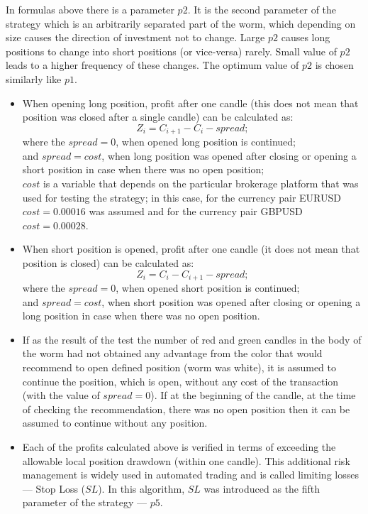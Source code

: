 \documentclass[runningheads,a4paper]{llncs}
\begin{document}
In formulas above there is a parameter $p2$. It is the second parameter of the strategy which is an arbitrarily separated part of the worm, which depending on size causes the direction of investment not to change. Large $p2$ causes long positions to change into short positions (or vice-versa) rarely. Small value of $p2$ leads to a higher frequency of these changes. The optimum value of $p2$ is chosen similarly like $p1$.
\begin{itemize}
\item 	When opening long position, profit after one candle (this does not mean that position was closed after a single candle) can be calculated as:
\begin{equation}
Z_i = C_{i+1} - C_i - spread;
\end{equation}
where the $spread = 0$, when opened long position is continued; \\
and $spread = cost$, when long position was opened after closing or opening a short position in case when there was no open position;\\
$cost$ is a variable that depends on the particular brokerage platform that was used for testing the strategy; in this case, for the currency pair EURUSD $cost = 0.00016$ was assumed and for the currency pair GBPUSD $cost = 0.00028$.
\item When short position is opened, profit after one candle (it does not mean that position is closed) can be calculated as: 
\begin{equation}
Z_i = C_i-C_{i+1}- spread;
\end{equation}
where the $spread = 0$, when opened short position is continued;\\ 
and $spread = cost$, when short position was opened after closing or opening a long position in case when there was no open position.
\end{itemize}

\begin{itemize}
\item If as the result of the test the number of red and green candles in the body of the worm had not obtained any advantage from the color that would recommend to open defined position (worm was white), it is assumed to continue the position, which is open, without any cost of the transaction (with the value of $spread = 0$). If at the beginning of the candle, at the time of checking the recommendation, there was no open position then it can be assumed to continue without any position.
\item Each of the profits calculated above is verified in terms of exceeding the allowable local position drawdown (within one candle). This additional risk management is widely used in automated trading and is called limiting losses --- Stop Loss ($SL$). In this algorithm, $SL$ was introduced as the fifth parameter of the strategy --- $p5$.
\end{itemize}
\end{document}
